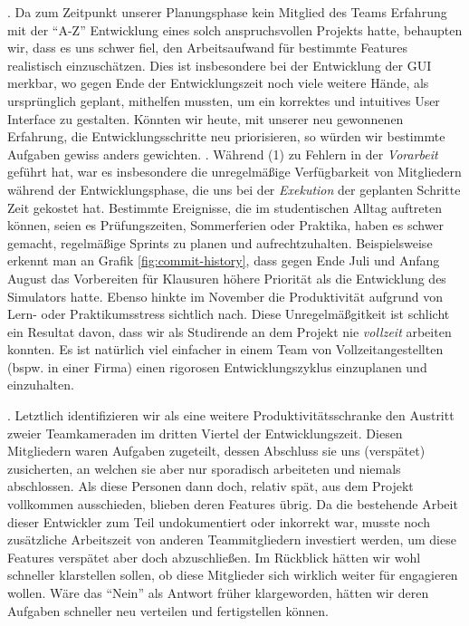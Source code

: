 \begin{enumerate}
  . Da zum Zeitpunkt
  unserer Planungsphase kein Mitglied des Teams Erfahrung mit der ``A-Z''
  Entwicklung eines solch anspruchsvollen Projekts hatte, behaupten wir, dass es
  uns schwer fiel, den Arbeitsaufwand für bestimmte Features realistisch
  einzuschätzen. Dies ist insbesondere bei der Entwicklung der GUI merkbar, wo
  gegen Ende der Entwicklungszeit noch viele weitere Hände, als ursprünglich
  geplant, mithelfen mussten, um ein korrektes und intuitives User Interface zu
  gestalten. Könnten wir heute, mit unserer neu gewonnenen Erfahrung, die
  Entwicklungsschritte neu priorisieren, so würden wir bestimmte Aufgaben gewiss
  anders gewichten.
  . Während (1) zu Fehlern in der
  \emph{Vorarbeit} geführt hat, war es insbesondere die unregelmäßige
  Verfügbarkeit von Mitgliedern während der Entwicklungsphase, die uns bei der
  \emph{Exekution} der geplanten Schritte Zeit gekostet hat. Bestimmte
  Ereignisse, die im studentischen Alltag auftreten können, seien es
  Prüfungszeiten, Sommerferien oder Praktika, haben es schwer gemacht,
  regelmäßige Sprints zu planen und aufrechtzuhalten. Beispielsweise erkennt man
  an Grafik \ref{fig:commit-history}, dass gegen Ende Juli und Anfang August das
  Vorbereiten für Klausuren höhere Priorität als die Entwicklung des Simulators
  hatte. Ebenso hinkte im November die Produktivität aufgrund von Lern- oder
  Praktikumsstress sichtlich nach. Diese Unregelmäßgitkeit ist schlicht ein
  Resultat davon, dass wir als Studirende an dem Projekt nie \emph{vollzeit}
  arbeiten konnten. Es ist natürlich viel einfacher in einem Team von
  Vollzeitangestellten (bspw. in einer Firma) einen rigorosen Entwicklungszyklus
  einzuplanen und einzuhalten.

  . Letztlich identifizieren wir als eine
  weitere Produktivitätsschranke den Austritt zweier Teamkameraden im dritten
  Viertel der Entwicklungszeit. Diesen Mitgliedern waren Aufgaben zugeteilt,
  dessen Abschluss sie uns (verspätet) zusicherten, an welchen sie aber nur
  sporadisch arbeiteten und niemals abschlossen. Als diese Personen dann doch,
  relativ spät, aus dem Projekt vollkommen ausschieden, blieben deren Features
  übrig. Da die bestehende Arbeit dieser Entwickler zum Teil undokumentiert oder
  inkorrekt war, musste noch zusätzliche Arbeitszeit von anderen Teammitgliedern
  investiert werden, um diese Features verspätet aber doch abzuschließen. Im Rückblick hätten wir wohl schneller klarstellen sollen, ob diese Mitglieder sich wirklich weiter für \erasim{} engagieren wollen. Wäre das ``Nein'' als Antwort früher klargeworden, hätten wir deren Aufgaben schneller neu verteilen und fertigstellen können.

\end{enumerate}

